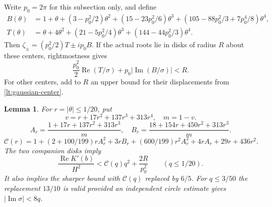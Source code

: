 \documentclass[11pt,reqno]{amsart}
\numberwithin{equation}{section}
\newtheorem{lemma}[theorem]{Lemma}
\theoremstyle{definition}
\theoremstyle{remark}
\renewcommand{\Re}{\operatorname{Re}}
\renewcommand{\Im}{\operatorname{Im}}
\begin{document}
Write $p_0=2\pi$ for this subsection only, and define
\begin{align*}
 B(\theta)&=1+\theta+(3-p_0^2/2)\theta^2
 +(15-23p_0^2/6)\theta^3
 +(105-88p_0^2/3+7p_0^4/8)\theta^4,\\
 T(\theta)&=\theta+4\theta^2+(21-5p_0^2/4)\theta^3
 +(144-44p_0^2/3)\theta^4.
\end{align*}
Then $\zeta_\pm=(p_0^2/2)T\pm ip_0B$. If the actual roots lie
in disks of radius $R$ about these centers, rightmostness gives
\begin{equation}\label{lt:signed-projection}
 \frac{p_0^2}2\Re(T/\sigma)+p_0|\Im(B/\sigma)|<R.
\end{equation}
For other centers, add to $R$ an upper bound for their displacements
from \eqref{lt:gaussian-center}.

\begin{lemma}\label{lt:signed-moment}
For $r=|\theta|\le1/20$, put
\[
 v=r+17r^2+137r^3+313r^4,\quad m=1-v.
\]
\[
 A_r=\frac{1+17r+137r^2+313r^3}{m},\quad
 B_r=\frac{18+154r+450r^2+313r^3}{m}.
\]
\[
 \mathcal C(r)=1+(2+100/199)rA_r^2+3rB_r
        +(600/199)r^2A_r^2+4rA_r+29r+436r^2.
\]
The two companion disks imply
\begin{equation}\label{lt:curvature-Cq}
 \frac{\Re K'(b)}{H^2}<\mathcal C(q)q^2+\frac{2R}{p_0^2}
 \qquad(q\le1/20).
\end{equation}
It also implies the sharper bound with $\mathcal C(q)$ replaced by
$6/5$. For $q\le3/50$ the replacement $13/10$ is valid provided
an independent circle estimate gives
$|\Im\sigma|<8q$.
\end{lemma}
\end{document}
